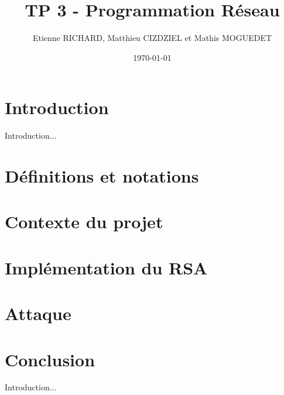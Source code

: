\documentclass[12pt]{article}
\title{TP 3 - Programmation Réseau}	\let\Title\@title
\author{Etienne RICHARD, Matthieu CIZDZIEL et Mathis MOGUEDET} \let\Author\@author
\date{\today}           	\let\Date\@date
\begin{document}
\maketitle
\pagebreak

\tableofcontents
\pagebreak

\section*{Introduction}
Introduction...

\section{Définitions et notations}


\section{Contexte du projet}


\section{Implémentation du RSA}


\section{Attaque}


\section*{Conclusion}
Introduction...

\medskip
\printbibliography
\end{document}
